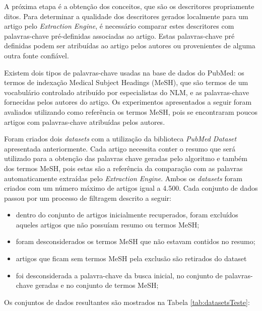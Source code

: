 A próxima etapa é a obtenção dos conceitos, que são os descritores propriamente ditos. Para determinar a qualidade dos descritores gerados localmente para um artigo pelo \emph{Extraction Engine}, é necessário comparar estes descritores com palavras-chave pré-definidas associadas ao artigo. Estas palavras-chave pré definidas podem ser atribuídas ao artigo pelos autores ou provenientes de alguma outra fonte confiável. 

Existem dois tipos de palavras-chave usadas na base de dados do PubMed: os termos de indexação Medical Subject Headings (MeSH), que são termos de um vocabulário controlado atribuído por especialistas do NLM, e as palavras-chave fornecidas pelos autores do artigo. Os experimentos apresentados a seguir foram avaliados utilizando como referência os termos MeSH, pois se encontraram poucos artigos com palavras-chave atribuídas pelos autores.

Foram criados dois \emph{datasets} com a utilização da biblioteca \emph{PubMed Dataset} apresentada anteriormente. Cada artigo necessita conter o resumo que será
utilizado para a obtenção das palavras chave geradas pelo algoritmo e também dos termos MeSH, pois estas são a referência da comparação com as palavras
automaticamente extraídas pelo \emph{Extraction Engine}. Ambos os \emph{datasets} foram criados com um número máximo de artigos igual a 4.500. Cada conjunto de dados passou por um processo de filtragem descrito a seguir:

\begin{itemize}
    \item dentro do conjunto de artigos inicialmente recuperados, foram excluídos aqueles artigos que não possuíam resumo ou termos MeSH;
    \item foram desconsiderados os termos MeSH que não estavam contidos no resumo;
    \item artigos que ficam sem termos MeSH pela exclusão são retirados do dataset
    \item foi desconsiderada a palavra-chave da busca inicial, no conjunto de palavras-chave geradas e no conjunto de termos MeSH;
\end{itemize}

Os conjuntos de dados resultantes são mostrados na Tabela \ref{tab:datasetsTeste}:

